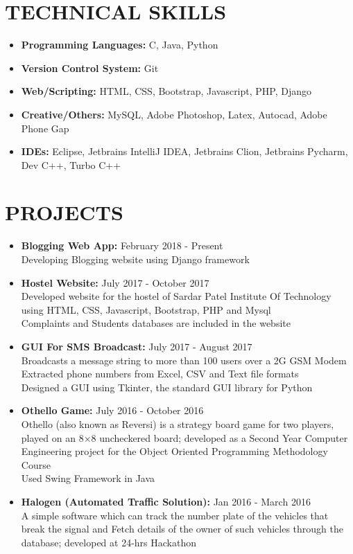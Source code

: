 \documentclass[11pt]{article} %
\newcommand{\NewPart}[1]{\section*{\uppercase{#1}}}
\begin{document}
\NewPart{    Technical Skills}{}

\vspace{0pt}

\begin{itemize}
\itemsep-0.5em 
\item \textbf{Programming Languages:} C, Java, Python

\item \textbf{Version Control System:} Git
\vspace{0pt}

\item \textbf{Web/Scripting:} HTML, CSS, Bootstrap, Javascript, PHP, Django
\item \textbf{Creative/Others:} MySQL, Adobe Photoshop, Latex, Autocad, Adobe Phone Gap

\item \textbf{IDEs:}  Eclipse, Jetbrains IntelliJ IDEA, Jetbrains Clion, Jetbrains Pycharm, Dev C++, Turbo C++
\end{itemize}



\NewPart{    Projects}{}
\begin{itemize}
\itemsep-0.5em
\item \textbf{Blogging Web App: }\hfill {February 2018 - Present}
\\Developing Blogging website using Django framework 
\item \textbf{Hostel Website: }\hfill {July 2017 - October 2017}
\\Developed website for the hostel of Sardar Patel Institute Of Technology using HTML, CSS, Javascript, Bootstrap, PHP and Mysql 
\\Complaints and Students databases are included in the website
\item \textbf{GUI For SMS Broadcast: }\hfill {July 2017 - August 2017}
\\Broadcasts a message string to more than 100 users over a 2G GSM Modem
\\Extracted phone numbers from Excel, CSV and Text file formats
\\Designed a GUI using Tkinter, the standard GUI library for Python
\item \textbf{Othello Game: }\hfill {July 2016 - October 2016}
\\Othello (also known as Reversi) is a strategy board game for two players, played on an 8×8 uncheckered board; developed as a Second Year Computer Engineering project for the Object Oriented Programming Methodology Course
\\Used Swing Framework in Java 
\item \textbf{Halogen (Automated Traffic Solution): }\hfill {Jan 2016 - March 2016}\\
A simple software which can track the number plate of the vehicles that break the signal and Fetch details of the owner of such vehicles through the database; developed at 24-hrs Hackathon
\end{itemize}
\end{document}
